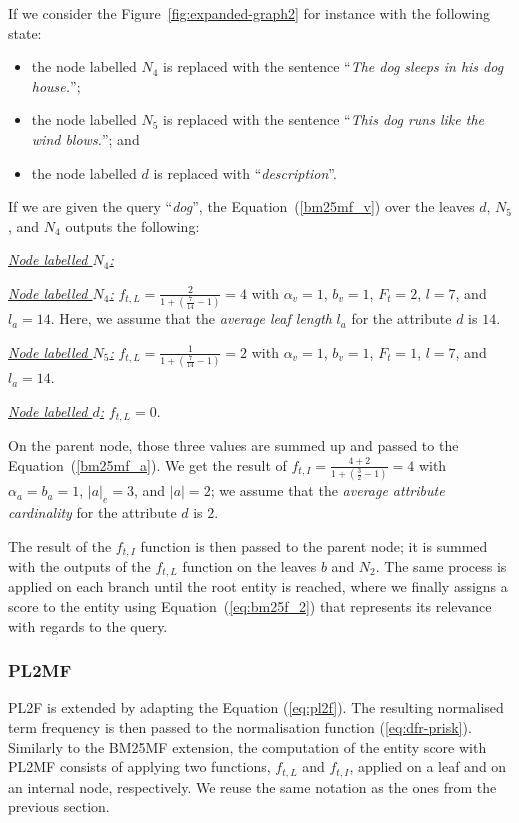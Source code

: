 If we consider the Figure~\ref{fig:expanded-graph2} for instance with the following state:
\begin{itemize}
	\item the node labelled $N_4$ is replaced with the sentence ``\textit{The dog sleeps in his dog house.}'';
	\item the node labelled $N_5$ is replaced with the sentence ``\textit{This dog runs like the wind blows.}''; and
	\item the node labelled $d$ is replaced with ``\textit{description}''.
\end{itemize}
If we are given the query ``\textit{dog}'', the Equation~(\ref{bm25mf_v}) over the leaves $d$, $N_5$, and $N_4$ outputs the following:
\begin{labeling}{\textit{\underline{Node labelled $N_4$:}}}
	\item[\textit{\underline{Node labelled $N_4$:}}] $f_{t,L} = \frac{2}{1 + (\frac{7}{14} - 1)} = 4$ with $\alpha_v=1$, $b_v=1$, $F_t=2$, $l=7$, and $l_a=14$. Here, we assume that the \emph{average leaf length} $l_a$ for the attribute $d$ is $14$.
	\item[\textit{\underline{Node labelled $N_5$:}}] $f_{t,L} = \frac{1}{1 + (\frac{7}{14} - 1)} = 2$ with $\alpha_v=1$, $b_v=1$, $F_t=1$, $l=7$, and $l_a=14$.
	\item[\textit{\underline{Node labelled $d$:}}] $f_{t,L} = 0$.
\end{labeling}
On the parent node, those three values are summed up and passed to the Equation~(\ref{bm25mf_a}). We get the result of $f_{t,I} = \frac{4 + 2}{1 + (\frac{3}{2} - 1)} = 4$ with $\alpha_a=b_a=1$, $\left|{a}\right|_e=3$, and $\left|{a}\right| = 2$; we assume that the \emph{average attribute cardinality} for the attribute $d$ is $2$.

The result of the $f_{t,I}$ function is then passed to the parent node; it is summed with the outputs of the $f_{t,L}$ function on the leaves $b$ and $N_2$. The same process is applied on each branch until the root entity is reached, where we finally assigns a score to the entity using Equation~(\ref{eq:bm25f_2}) that represents its relevance with regards to the query.

\subsubsection{PL2MF}
\label{sec:pl2mf-function}

PL2F is extended by adapting the Equation (\ref{eq:pl2f}). The resulting normalised term frequency is then passed to the normalisation function (\ref{eq:dfr-prisk}).
Similarly to the \gls{BM25MF} extension, the computation of the entity score with \gls{PL2MF} consists of applying two functions, $f_{t,L}$ and $f_{t,I}$, applied on a leaf and on an internal node, respectively. We reuse the same notation as the ones from the previous section.\\ 

